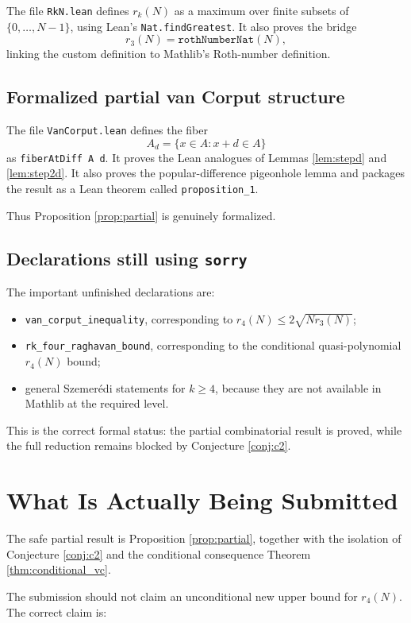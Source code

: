 \documentclass[11pt]{article}
\begin{document}
The file \texttt{RkN.lean} defines \(r_k(N)\) as a maximum over finite subsets of
\(\{0,\ldots,N-1\}\), using Lean's \texttt{Nat.findGreatest}.  It also proves the
bridge
\[
  r_3(N)=\texttt{rothNumberNat}(N),
\]
linking the custom definition to Mathlib's Roth-number definition.

\subsection{Formalized partial van Corput structure}

The file \texttt{VanCorput.lean} defines the fiber
\[
  A_d=\{x\in A:x+d\in A\}
\]
as \texttt{fiberAtDiff A d}.  It proves the Lean analogues of Lemmas
\ref{lem:stepd} and \ref{lem:step2d}.  It also proves the popular-difference
pigeonhole lemma and packages the result as a Lean theorem called
\texttt{proposition\_1}.

Thus Proposition \ref{prop:partial} is genuinely formalized.

\subsection{Declarations still using \texttt{sorry}}

The important unfinished declarations are:
\begin{itemize}
  \item \texttt{van\_corput\_inequality}, corresponding to
  \(r_4(N)\leq 2\sqrt{N r_3(N)}\);
  \item \texttt{rk\_four\_raghavan\_bound}, corresponding to the conditional
  quasi-polynomial \(r_4(N)\) bound;
  \item general Szemerédi statements for \(k\geq4\), because they are not
  available in Mathlib at the required level.
\end{itemize}

This is the correct formal status: the partial combinatorial result is proved,
while the full reduction remains blocked by Conjecture \ref{conj:c2}.

\section{What Is Actually Being Submitted}

The safe partial result is Proposition \ref{prop:partial}, together with the
isolation of Conjecture \ref{conj:c2} and the conditional consequence Theorem
\ref{thm:conditional_vc}.

The submission should not claim an unconditional new upper bound for \(r_4(N)\).
The correct claim is:
\end{document}
